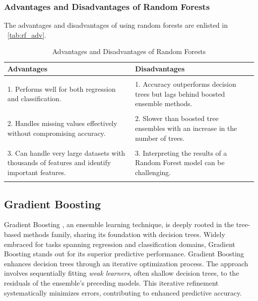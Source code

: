 \subsubsection{Advantages and Disadvantages of Random Forests}
The advantages and disadvantages of using random forests are enlisted in ~\autoref{tab:rf_adv}.
\begin{table}[H]
    \centering
    \caption{Advantages and Disadvantages of Random Forests}
    \label{tab:rf_adv}
    \begin{tabularx}{\textwidth}{X|X}
        \hline
        \textbf{Advantages}                                                                           & \textbf{Disadvantages}                                                           \\
        \hline                                                                                                                                                                           \\
        1. Performs well for both regression and classification.                                      & 1. Accuracy outperforms decision trees but lags behind boosted ensemble methods. \\ \\
        2. Handles missing values effectively without compromising accuracy.                          & 2. Slower than boosted tree ensembles with an increase in the number of trees.   \\ \\
        3. Can handle very large datasets with thousands of features and identify important features. & 3. Interpreting the results of a Random Forest model can be challenging.         \\ \\
        \hline
    \end{tabularx}
\end{table}
\FloatBarrier

\subsection{Gradient Boosting} \label{sec:gb}

Gradient Boosting \cite{zpz_gradient_boosting}, an ensemble learning technique, is deeply rooted in the tree-based methods family, sharing its foundation with decision trees.
Widely embraced for tasks spanning regression and classification domains, Gradient Boosting stands out for its superior predictive performance.
Gradient Boosting enhances decision trees through an iterative optimization process.
The approach involves sequentially fitting \textit{weak learners}, often shallow decision trees, to the residuals of the ensemble's preceding models.
This iterative refinement systematically minimizes errors, contributing to enhanced predictive accuracy.


